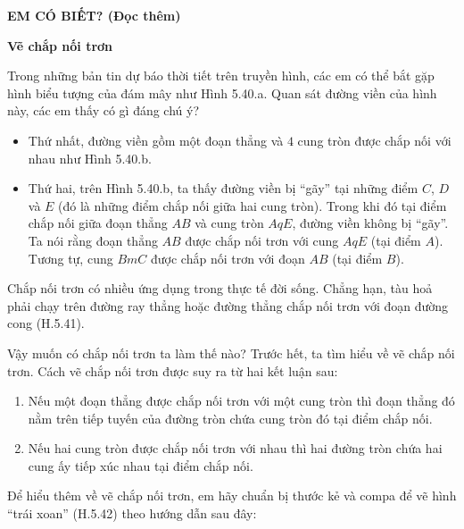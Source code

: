 \begin{exercises}
\begin{questions}[resume=SGK]
\begin{questions}
            \answerline
            \answerline
            \answerline
        \end{questions}
    \end{questions}

    \textbf{EM CÓ BIẾT? (Đọc thêm)}

    \textbf{Vẽ chắp nối trơn}

    Trong những bản tin dự báo thời tiết trên truyền hình, các em có thể bắt gặp hình biểu tượng của đám mây như Hình 5.40.a. Quan sát đường viền của hình này, các em thấy có gì đáng chú ý?


    \begin{itemize}
        \item Thứ nhất, đường viền gồm một đoạn thẳng và $4$ cung tròn được chắp nối với nhau như Hình 5.40.b.
        \item Thứ hai, trên Hình 5.40.b, ta thấy đường viền bị ``gãy'' tại những điểm $C$, $D$ và $E$ (đó là những điểm chắp nối giữa hai cung tròn). Trong khi đó tại điểm chắp nối giữa đoạn thẳng $AB$ và cung tròn $AqE$, đường viền không bị ``gãy''. Ta nói rằng đoạn thẳng $AB$ được chắp nối trơn với cung $AqE$ (tại điểm $A$). Tương tự, cung $BmC$ được chắp nối trơn với đoạn $AB$ (tại điểm $B$).
    \end{itemize}

    Chắp nối trơn có nhiều ứng dụng trong thực tế đời sống. Chẳng hạn, tàu hoả phải chạy trên đường ray thẳng hoặc đường thẳng chắp nối trơn với đoạn đường cong (H.5.41).


    Vậy muốn có chắp nối trơn ta làm thế nào? Trước hết, ta tìm hiểu về vẽ chắp nối trơn. Cách vẽ chắp nối trơn được suy ra từ hai kết luận sau:
    \begin{enumerate}[label=\arabic*)]
        \item Nếu một đoạn thẳng được chắp nối trơn với một cung tròn thì đoạn thẳng đó nằm trên tiếp tuyến của đường tròn chứa cung tròn đó tại điểm chắp nối.
        \item Nếu hai cung tròn được chắp nối trơn với nhau thì hai đường tròn chứa hai cung ấy tiếp xúc nhau tại điểm chắp nối.
    \end{enumerate}

    Để hiểu thêm về vẽ chắp nối trơn, em hãy chuẩn bị thước kẻ và compa để vẽ hình ``trái xoan'' (H.5.42) theo hướng dẫn sau đây:


\end{exercises}
